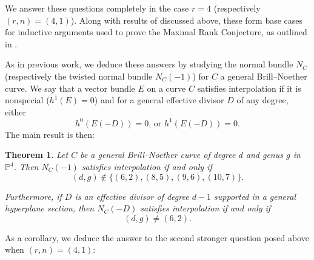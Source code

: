 \documentclass[11pt]{amsart}
\newcommand{\pp}{\mathbb{P}}
\newtheorem{ithm}{Theorem}
\newcommand{\defi}[1]{\textsf{#1}}
\theoremstyle{definition}
\theoremstyle{remark}
\begin{document}
We answer these questions completely in the case $r=4$
(respectively $(r, n) = (4, 1)$).  Along with results of \cite{vogt, quadrics} discussed above, these form base cases for inductive arguments used to prove the Maximal Rank Conjecture, as outlined in \cite{over}.

As in previous work, we deduce these answers by studying the normal bundle $N_C$ (respectively the twisted normal bundle $N_C(-1)$) for $C$ a general Brill--Noether curve.  We say that a vector bundle $E$ on a curve $C$ \defi{satisfies interpolation} if it is nonspecial ($h^1(E) =0$) and for a general effective divisor $D$ of any degree, either 
\[ h^0(E(-D)) = 0\text{, or } h^1(E(-D))=0. \]
The main result is then:

\begin{ithm}\label{main}
Let $C$ be a general Brill--Noether curve of degree $d$ and genus $g$ in $\pp^4$.  Then $N_C(-1)$ satisfies interpolation if and only if
\[(d,g) \notin \{(6,2), (8,5), (9,6), (10,7)\}.\]

Furthermore, if $D$ is an effective divisor of degree $d - 1$
supported in a general hyperplane section, then $N_C(-D)$ satisfies interpolation
if and only if
\[(d, g) \neq (6, 2).\]
\end{ithm}

As a corollary, we deduce the answer to the second
stronger question posed above when $(r, n) = (4, 1)$:
\end{document}
